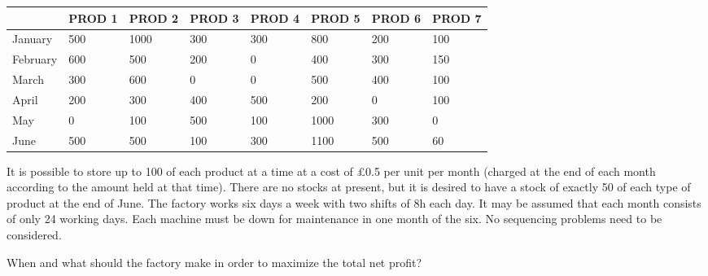 \documentclass[12pt,a4paper]{article}
\theoremstyle{definition}
\begin{document}
\begin{table}[htbp]
  \scriptsize
  \centering
  \renewcommand\arraystretch{1.1}
  \begin{tabular}{m{} m{}<{\centering} m{}<{\centering} m{}<{\centering} m{}<{\centering} m{}<{\centering} m{}<{\centering} m{}<{\centering}}
  \hline
   & \textbf{PROD 1} & \textbf{PROD 2} & \textbf{PROD 3} & \textbf{PROD 4} & \textbf{PROD 5} & \textbf{PROD 6} &  \textbf{PROD 7} \\\hline
  January & 500 & 1000 & 300 & 300 & 800 & 200 & 100 \\
  February & 600 & 500 & 200 & 0 & 400 & 300 & 150 \\
  March & 300 & 600 & 0 & 0 & 500 & 400 & 100 \\
  April & 200 & 300 & 400 & 500 & 200 & 0 & 100 \\
  May & 0 & 100 & 500 & 100 & 1000 & 300 & 0 \\
  June & 500 & 500 & 100 & 300 & 1100 & 500 & 60 \\
  \hline
  \end{tabular}
\end{table}

It is possible to store up to 100 of each product at a time at a cost of \pounds0.5 per unit per month (charged at the end of each month according to the amount held at that time). There are no stocks at present, but it is desired to have a stock of exactly 50 of each type of product at the end of June. The factory works six days a week with two shifts of 8h each day. It may be assumed that each month consists of only 24 working days. Each machine must be down for maintenance in one month of the six. No sequencing problems need to be considered.

When and what should the factory make in order to maximize the total net profit?
\end{document}
